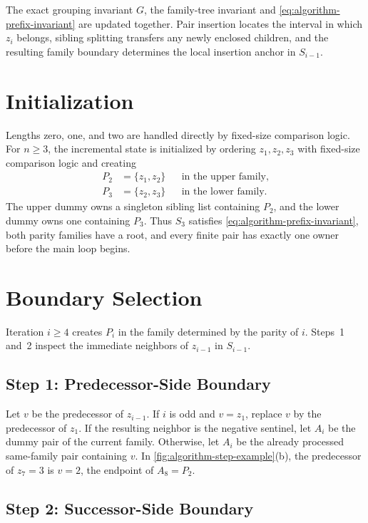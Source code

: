 The exact grouping invariant $G$, the family-tree invariant and
\cref{eq:algorithm-prefix-invariant} are updated
together. Pair insertion locates the interval in which $z_i$ belongs, sibling
splitting transfers any newly enclosed children, and the resulting family
boundary determines the local insertion anchor in $S_{i-1}$.

\section{Initialization}
\label{sec:algorithm-initialization}

Lengths zero, one, and two are handled directly by fixed-size comparison logic.
For $n\geq 3$, the incremental state is initialized by ordering
$z_1,z_2,z_3$ with fixed-size comparison logic and creating
\begin{align}
  P_2 &= \{z_1,z_2\} &&\text{in the upper family},\\
  P_3 &= \{z_2,z_3\} &&\text{in the lower family}.
\end{align}
The upper dummy owns a singleton sibling list containing $P_2$, and the lower
dummy owns one containing $P_3$. Thus $S_3$ satisfies
\cref{eq:algorithm-prefix-invariant}, both parity families have a root, and
every finite pair has exactly one owner before the main loop begins.

\section{Boundary Selection}
\label{sec:algorithm-boundary-selection}

Iteration $i\geq 4$ creates $P_i$ in the family determined by the parity of
$i$. Steps~1 and~2 inspect the immediate neighbors of $z_{i-1}$ in
$S_{i-1}$.

\subsection{Step 1: Predecessor-Side Boundary}
\label{sec:algorithm-step1}

Let $v$ be the predecessor of $z_{i-1}$. If $i$ is odd and $v=z_1$, replace
$v$ by the predecessor of $z_1$. If the resulting neighbor is the negative
sentinel, let $A_i$ be the dummy pair of the current family. Otherwise, let
$A_i$ be the already processed same-family pair containing $v$.
In \cref{fig:algorithm-step-example}(b), the predecessor of $z_7=3$ is
$v=2$, the endpoint of $A_8=P_2$.

\subsection{Step 2: Successor-Side Boundary}
\label{sec:algorithm-step2}

